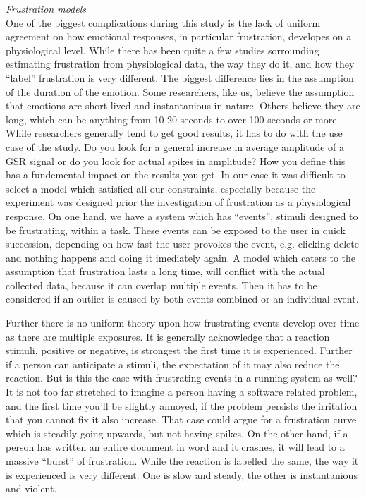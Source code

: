 \textit{Frustration models}\\
One of the biggest complications during this study is the lack of uniform agreement on how emotional responses, in particular frustration, developes on a physiological level. While there has been quite a few studies sorrounding estimating frustration from physiological data, the way they do it, and how they ``label'' frustration is very different.
The biggest difference lies in the assumption of the duration of the emotion. 
Some researchers, like us, believe the assumption that emotions are short lived and instantanious in nature. 
Others believe they are long, which can be anything from 10-20 seconds to over 100 seconds or more. 
While researchers generally tend to get good results, it has to do with the use case of the study. 
Do you look for a general increase in average amplitude of a GSR signal or do you look for actual spikes in amplitude? 
How you define this has a fundemental impact on the results you get. 
In our case it was difficult to select a model which satisfied all our constraints, especially because the experiment was designed prior the investigation of frustration as a physiological response. 
On one hand, we have a system which has ``events'', stimuli designed to be frustrating, within a task. These events can be exposed to the user in quick succession, depending on how fast the user provokes the event, e.g. clicking delete and nothing happens and doing it imediately again. 
A model which caters to the assumption that frustration lasts a long time, will conflict with the actual collected data, because it can overlap multiple events. Then it has to be considered if an outlier is caused by both events combined or an individual event. 

Further there is no uniform theory upon how frustrating events develop over time as there are multiple exposures. It is generally acknowledge that a reaction stimuli, positive or negative, is strongest the first time it is experienced. Further if a person can anticipate a stimuli, the expectation of it may also reduce the reaction. But is this the case with frustrating events in a running system as well? It is not too far stretched to imagine a person having a software related problem, and the first time you'll be slightly annoyed, if the problem persists the irritation that you cannot fix it also increase. That case could argue for a frustration curve which is steadily going upwards, but not having spikes.
On the other hand, if a person has written an entire document in word and it crashes, it will lead to a massive ``burst'' of frustration. 
While the reaction is labelled the same, the way it is experienced is very different. One is slow and steady, the other is instantanious and violent.


